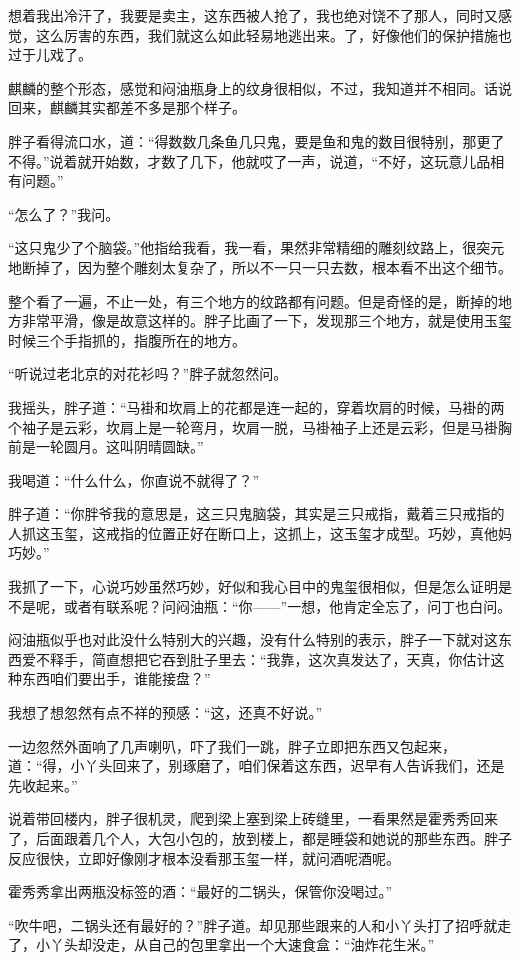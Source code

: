 想着我出冷汗了，我要是卖主，这东西被人抢了，我也绝对饶不了那人，同时又感觉，这么厉害的东西，我们就这么如此轻易地逃出来。了，好像他们的保护措施也过于儿戏了。

麒麟的整个形态，感觉和闷油瓶身上的纹身很相似，不过，我知道并不相同。话说回来，麒麟其实都差不多是那个样子。

胖子看得流口水，道：“得数数几条鱼几只鬼，要是鱼和鬼的数目很特别，那更了不得。”说着就开始数，才数了几下，他就哎了一声，说道，“不好，这玩意儿品相有问题。”

“怎么了？”我问。

“这只鬼少了个脑袋。”他指给我看，我一看，果然非常精细的雕刻纹路上，很突元地断掉了，因为整个雕刻太复杂了，所以不一只一只去数，根本看不出这个细节。

整个看了一遍，不止一处，有三个地方的纹路都有问题。但是奇怪的是，断掉的地方非常平滑，像是故意这样的。胖子比画了一下，发现那三个地方，就是使用玉玺时候三个手指抓的，指腹所在的地方。

“听说过老北京的对花衫吗？”胖子就忽然问。

我摇头，胖子道：“马褂和坎肩上的花都是连一起的，穿着坎肩的时候，马褂的两个袖子是云彩，坎肩上是一轮弯月，坎肩一脱，马褂袖子上还是云彩，但是马褂胸前是一轮圆月。这叫阴晴圆缺。”

我喝道：“什么什么，你直说不就得了？”

胖子道：“你胖爷我的意思是，这三只鬼脑袋，其实是三只戒指，戴着三只戒指的人抓这玉玺，这戒指的位置正好在断口上，这抓上，这玉玺才成型。巧妙，真他妈巧妙。”

我抓了一下，心说巧妙虽然巧妙，好似和我心目中的鬼玺很相似，但是怎么证明是不是呢，或者有联系呢？问闷油瓶：“你——”一想，他肯定全忘了，问丁也白问。

闷油瓶似乎也对此没什么特别大的兴趣，没有什么特别的表示，胖子一下就对这东西爱不释手，简直想把它吞到肚子里去：“我靠，这次真发达了，天真，你估计这种东西咱们要出手，谁能接盘？”

我想了想忽然有点不祥的预感：“这，还真不好说。”

一边忽然外面响了几声喇叭，吓了我们一跳，胖子立即把东西又包起来，道：“得，小丫头回来了，别琢磨了，咱们保着这东西，迟早有人告诉我们，还是先收起来。”

说着带回楼内，胖子很机灵，爬到梁上塞到梁上砖缝里，一看果然是霍秀秀回来了，后面跟着几个人，大包小包的，放到楼上，都是睡袋和她说的那些东西。胖子反应很快，立即好像刚才根本没看那玉玺一样，就问酒呢酒呢。

霍秀秀拿出两瓶没标签的酒：“最好的二锅头，保管你没喝过。”

“吹牛吧，二锅头还有最好的？”胖子道。却见那些跟来的人和小丫头打了招呼就走了，小丫头却没走，从自己的包里拿出一个大速食盒：“油炸花生米。”

